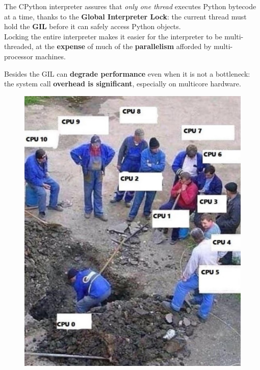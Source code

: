 \begin{paracol}{2}
\colfill

The CPython interpreter assures that \textit{only one thread} executes Python bytecode at a time, thanks to the \textbf{Global
Interpreter Lock}:
the current thread must hold the \textbf{GIL} before it can safely access Python objects.\\
Locking the entire interpreter makes it easier for the
interpreter to be multi-threaded, at the \textbf{expense} of much of
the \textbf{parallelism} afforded by multi-processor machines.

Besides the GIL can \textbf{degrade performance} even when it is
not a bottleneck:
the system call \textbf{overhead is significant},
especially on multicore hardware.

\colfill
\switchcolumn
\begin{figure}[htbp]
   \centering
   \includegraphics[width=0.9\columnwidth]{images/python_concurrency.png}
   \label{fig:python_concurrency}
\end{figure}
\end{paracol}

